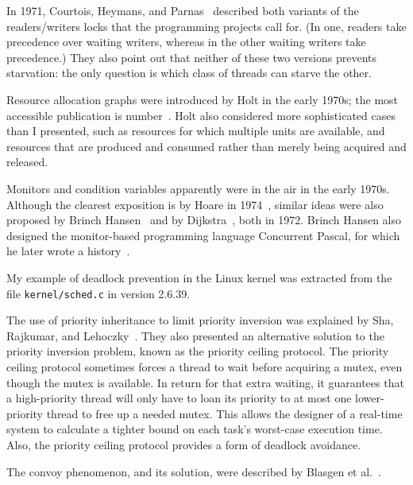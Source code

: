 In 1971, Courtois,
Heymans, and Parnas~\cite{max997} described both
variants of the readers/writers locks
that the programming projects call for.  (In
one, readers take precedence over waiting writers, whereas in the
other waiting writers take precedence.)  They also point out that
neither of these two versions prevents starvation: the only question
is which class of threads can starve the other.

Resource allocation graphs were
introduced by Holt in the early
1970s; the most accessible publication is number~\cite{max990}.  Holt also
considered more sophisticated cases than I presented, such as
resources for which multiple units are available, and resources that
are produced and consumed rather than merely being acquired and
released.

Monitors and condition variables apparently were in the air in the
early 1970s.  Although the clearest exposition is by Hoare in
1974~\cite{max991}, similar ideas were also proposed by Brinch
Hansen~\cite{max992} and by Dijkstra~\cite{max993}, both in 1972.  Brinch Hansen also
designed the monitor-based programming language Concurrent Pascal, for
which he
later wrote a history~\cite{max1172}.

My example of deadlock prevention in the Linux kernel was extracted
from the file \verb|kernel/sched.c| in version 2.6.39.

The use of priority inheritance to limit priority inversion was
explained by  Sha, Rajkumar, and Lehoczky~\cite{max1171}.  They also
presented an alternative solution to the priority inversion problem,
known as the priority ceiling protocol.  The priority ceiling protocol
sometimes forces a thread to wait before acquiring a mutex, even
though the mutex is available.  In return for that extra waiting, it guarantees that
a high-priority thread will only have to loan its priority to at most one
lower-priority thread to free up a needed mutex.  This allows the
designer of a real-time system to calculate a tighter bound on each
task's worst-case execution time.  Also, the priority
ceiling protocol provides a form of deadlock avoidance.

The convoy phenomenon, and its solution, were
described by Blasgen
et al.~\cite{max1010}.

